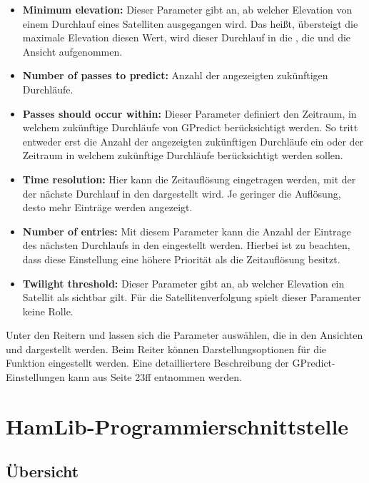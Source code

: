 \begin{itemize}
	\parskip0pt
	\item \textbf{Minimum elevation:} Dieser Parameter gibt an, ab welcher Elevation von einem Durchlauf eines Satelliten ausgegangen wird. Das heißt, übersteigt die maximale Elevation diesen Wert, wird dieser Durchlauf in die , die  und die Ansicht  aufgenommen.
	\item \textbf{Number of passes to predict:} Anzahl der angezeigten zukünftigen Durchläufe.
	\item \textbf{Passes should occur within:} Dieser Parameter definiert den Zeitraum, in welchem zukünftige Durchläufe von GPredict berücksichtigt werden. So tritt entweder erst die Anzahl der angezeigten zukünftigen Durchläufe ein oder der Zeitraum in welchem zukünftige Durchläufe berücksichtigt werden sollen.
	\item \textbf{Time resolution:}	Hier kann die Zeitauflösung eingetragen werden, mit der der nächste Durchlauf in den  dargestellt wird. Je geringer die Auflösung, desto mehr Einträge werden angezeigt.
	\item \textbf{Number of entries:} Mit diesem Parameter kann die Anzahl der Eintrage des nächsten Durchlaufs in den  eingestellt werden. Hierbei ist zu beachten, dass diese Einstellung eine höhere Priorität als die Zeitauflösung besitzt.
	\item \textbf{Twilight threshold:} Dieser Parameter gibt an, ab welcher Elevation ein Satellit als sichtbar gilt. Für die Satellitenverfolgung spielt dieser Paramenter keine Rolle.
\end{itemize}

Unter den Reitern  und  lassen sich die Parameter auswählen, die in den Ansichten  und  dargestellt werden. Beim Reiter  können Darstellungsoptionen für die Funktion  eingestellt werden.\newpar
Eine detailliertere Beschreibung der GPredict-Einstellungen kann aus \cite{gpredictmanual} Seite 23ff entnommen werden.

\section{HamLib-Programmierschnittstelle}

\subsection{Übersicht}

